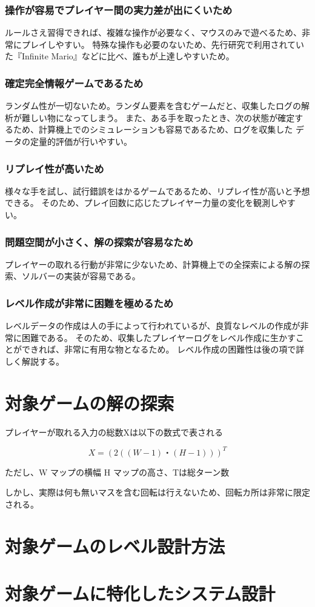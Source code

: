 \subsubsection{操作が容易でプレイヤー間の実力差が出にくいため}
ルールさえ習得できれば、複雑な操作が必要なく、マウスのみで遊べるため、非常にプレイしやすい。
特殊な操作も必要のないため、先行研究で利用されていた『Infinite Mario』などに比べ、誰もが上達しやすいため。
\subsubsection{確定完全情報ゲームであるため}
ランダム性が一切ないため。ランダム要素を含むゲームだと、収集したログの解析が難しい物になってしまう。
また、ある手を取ったとき、次の状態が確定するため、計算機上でのシミュレーションも容易であるため、ログを収集した
データの定量的評価が行いやすい。
\subsubsection{リプレイ性が高いため}
様々な手を試し、試行錯誤をはかるゲームであるため、リプレイ性が高いと予想できる。
そのため、プレイ回数に応じたプレイヤー力量の変化を観測しやすい。

\subsubsection{問題空間が小さく、解の探索が容易なため}
プレイヤーの取れる行動が非常に少ないため、計算機上での全探索による解の探索、ソルバーの実装が容易である。

\subsubsection{レベル作成が非常に困難を極めるため}
レベルデータの作成は人の手によって行われているが、良質なレベルの作成が非常に困難である。
そのため、収集したプレイヤーログをレベル作成に生かすことができれば、非常に有用な物となるため。
レベル作成の困難性は後の項で詳しく解説する。


\section{対象ゲームの解の探索}
プレイヤーが取れる入力の総数Xは以下の数式で表される

\[ X = (2((W-1)・(H-1)))^T \]

ただし、W マップの横幅 H マップの高さ、Tは総ターン数

しかし、実際は何も無いマスを含む回転は行えないため、回転カ所は非常に限定される。


\section{対象ゲームのレベル設計方法}
\section{対象ゲームに特化したシステム設計}
